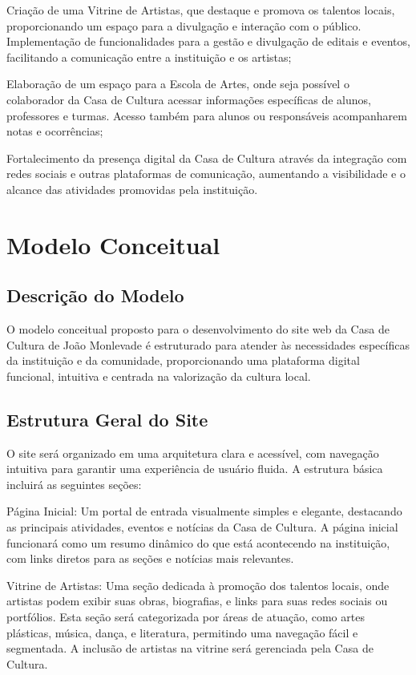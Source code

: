 Criação de uma Vitrine de Artistas, que destaque e promova os talentos locais, proporcionando um espaço para a divulgação e interação com o público.
Implementação de funcionalidades para a gestão e divulgação de editais e eventos, facilitando a comunicação entre a instituição e os artistas;

Elaboração de um espaço para a Escola de Artes, onde seja possível o colaborador da Casa de Cultura acessar informações específicas de alunos, professores e turmas. Acesso também para alunos ou responsáveis acompanharem notas e ocorrências;

Fortalecimento da presença digital da Casa de Cultura através da integração com redes sociais e outras plataformas de comunicação, aumentando a visibilidade e o alcance das atividades promovidas pela instituição.

\section{Modelo Conceitual}

\subsection{Descrição do Modelo}

O modelo conceitual proposto para o desenvolvimento do site web da Casa de Cultura de João Monlevade é estruturado para atender às necessidades específicas da instituição e da comunidade, proporcionando uma plataforma digital funcional, intuitiva e centrada na valorização da cultura local.

\subsection{Estrutura Geral do Site}

O site será organizado em uma arquitetura clara e acessível, com navegação intuitiva para garantir uma experiência de usuário fluida. A estrutura básica incluirá as seguintes seções:

Página Inicial: Um portal de entrada visualmente simples e elegante, destacando as principais atividades, eventos e notícias da Casa de Cultura. A página inicial funcionará como um resumo dinâmico do que está acontecendo na instituição, com links diretos para as seções e notícias mais relevantes.

Vitrine de Artistas: Uma seção dedicada à promoção dos talentos locais, onde artistas podem exibir suas obras, biografias, e links para suas redes sociais ou portfólios. Esta seção será categorizada por áreas de atuação, como artes plásticas, música, dança, e literatura, permitindo uma navegação fácil e segmentada. A inclusão de artistas na vitrine será gerenciada pela Casa de Cultura.

